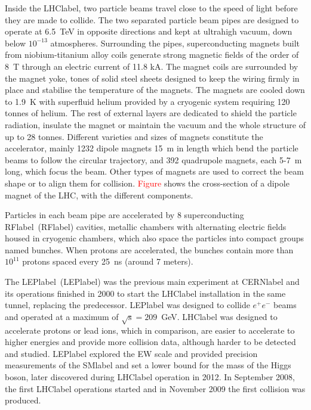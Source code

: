 Inside the \acrshort{LHClabel}, two particle beams travel close to the speed of light before they are made to collide. The two separated particle beam pipes are designed to operate at 6.5~TeV in opposite directions and kept at ultrahigh vacuum, down below $10^{-13}$ atmospheres. Surrounding the pipes, superconducting magnets built from niobium-titanium alloy coils generate strong magnetic fields of the order of 8~T through an electric current of 11.8 kA. The magnet coils are surrounded by the magnet yoke, tones of solid steel sheets designed to keep the wiring firmly in place and stabilise the temperature of the magnets. The magnets are cooled down to 1.9~K with superfluid helium provided by a cryogenic system requiring 120 tonnes of helium. The rest of external layers are dedicated to shield the particle radiation, insulate the magnet or maintain the vacuum and the whole structure of up to 28 tonnes. Different varieties and sizes of magnets constitute the accelerator, mainly 1232 dipole magnets 15~m in length which bend the particle beams to follow the circular trajectory, and 392 quadrupole magnets, each 5-7~m long, which focus the beam. Other types of magnets are used to correct the beam shape or to align them for collision. \textcolor{red}{Figure} shows the cross-section of a dipole magnet of the LHC, with the different components.

Particles in each beam pipe are accelerated by 8 superconducting \acrlong{RFlabel}~(\acrshort{RFlabel}) cavities, metallic chambers with alternating electric fields housed in cryogenic chambers, which also space the particles into compact groups named bunches. When protons are accelerated, the bunches contain more than $10^11$ protons spaced every 25~ns (around 7 meters).

The \acrlong{LEPlabel}~(\acrshort{LEPlabel}) was the previous main experiment at \acrshort{CERNlabel} and its operations finished in 2000 to start the \acrshort{LHClabel} installation in the same tunnel, replacing the predecessor. \acrshort{LEPlabel} was designed to collide $e^+e^-$ beams and operated at a maximum of $\sqrt{\text{s}}=209$~GeV. \acrshort{LHClabel} was designed to accelerate protons or lead ions, which in comparison, are easier to accelerate to higher energies and provide more collision data, although harder to be detected and studied. \acrshort{LEPlabel} explored the \acrshort{EW} scale and provided precision measurements of the \acrshort{SMlabel} and set a lower bound for the mass of the Higgs boson, later discovered during \acrshort{LHClabel} operation in 2012. In September 2008, the first \acrshort{LHClabel} operations started and in November 2009 the first collision was produced. 

